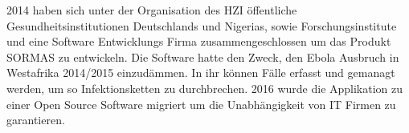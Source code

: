 2014 haben sich unter der Organisation des \ac{HZI} öffentliche Gesundheitsinstitutionen Deutschlands und Nigerias, sowie Forschungsinstitute und eine Software Entwicklungs Firma zusammengeschlossen um das Produkt \ac{SORMAS} zu entwickeln.
Die Software hatte den Zweck, den Ebola Ausbruch in Westafrika 2014/2015 einzudämmen.
In ihr können Fälle erfasst und gemanagt werden, um so Infektionsketten zu durchbrechen.
2016 wurde die Applikation zu einer Open Source Software migriert um die Unabhängigkeit von IT Firmen zu garantieren.
\cite{SORMAS_history}